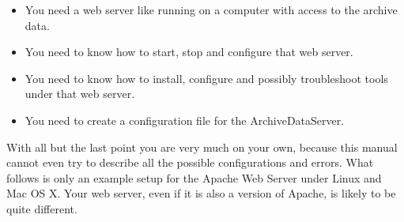 \begin{itemize}
\item You need a web server like  running on a computer
      with access to the archive data.
\item You need to know how to start, stop and configure that
      web server.
\item You need to know how to install, configure and possibly
      troubleshoot  tools under that web server.
\item You need to create a configuration file for the ArchiveDataServer.
\end{itemize}

\noindent With all but the last point you are very much on your own, because
this manual cannot even try to describe all the possible configurations
and errors.
What follows is only an example setup for the Apache Web Server under Linux
and Mac OS X. Your web server, even if it is also a version of Apache,
is likely to be quite different.

